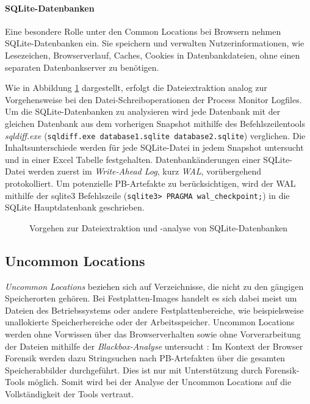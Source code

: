 \paragraph*{SQLite-Datenbanken}
\label{subsubsection:methodik-datenanalyse-commonlocations-sqlitedbs}
Eine besondere Rolle unter den Common Locations bei Browsern nehmen SQLite-Datenbanken ein. 
Sie speichern und verwalten Nutzerinformationen, wie Lesezeichen, Browserverlauf, Caches, Cookies in Datenbankdateien, ohne einen separaten Datenbankserver zu benötigen.

Wie in Abbildung \ref{img:dateiextraktion-und-analyse-sqlite} dargestellt, erfolgt die Dateiextraktion analog zur Vorgehensweise bei den Datei-Schreiboperationen der Process Monitor Logfiles. Um die SQLite-Datenbanken zu analysieren wird jede Datenbank mit der gleichen Datenbank aus dem vorherigen Snapshot mithilfe des Befehlszeilentools \textit{sqldiff.exe} (\texttt{sqldiff.exe database1.sqlite database2.sqlite}) verglichen. Die Inhaltsunterschiede werden für jede SQLite-Datei in jedem Snapshot untersucht und in einer Excel Tabelle festgehalten.
Datenbankänderungen einer SQLite-Datei werden zuerst im \textit{Write-Ahead Log}, kurz \textit{WAL}, vorübergehend protokolliert. 
Um potenzielle PB-Artefakte zu berücksichtigen, wird der WAL mithilfe der sqlite3 Befehlszeile (\texttt{sqlite3> PRAGMA wal\_checkpoint;}) in die SQLite Hauptdatenbank geschrieben.
\begin{figure}[h!]
	\centering
	\small
	\centerline{\resizebox{\linewidth}{!}{}}
	\caption{Vorgehen zur Dateiextraktion und -analyse von SQLite-Datenbanken}
	\label{img:dateiextraktion-und-analyse-sqlite}
\end{figure}

\subsection{Uncommon Locations}
\label{subsection:methodik-datenanalyse-uncommonlocations}
\textit{Uncommon Locations} beziehen sich auf Verzeichnisse, die nicht zu den gängigen Speicherorten gehören. 
Bei Festplatten-Images handelt es sich dabei meist um Dateien des Betriebssystems oder andere Festplattenbereiche, wie beispielsweise unallokierte Speicherbereiche oder der Arbeitsspeicher.
Uncommon Locations werden ohne Vorwissen über das Browserverhalten sowie ohne Vorverarbeitung der Dateien mithilfe der \textit{Blackbox-Analyse} untersucht \cite{Bonetti.2014}:
Im Kontext der Browser Forensik werden dazu Stringsuchen nach PB-Artefakten über die gesamten Speicherabbilder durchgeführt.
Dies ist nur mit Unterstützung durch Forensik-Tools möglich. Somit wird bei der Analyse der Uncommon Locations auf die Vollständigkeit der Tools vertraut.

